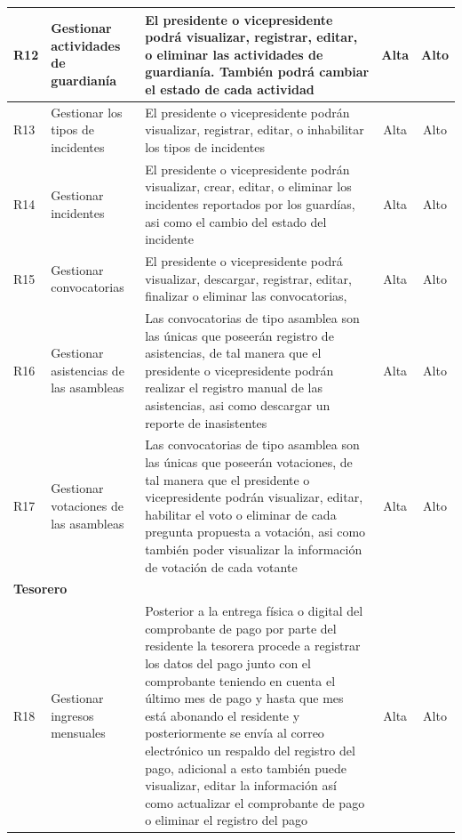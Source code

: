 \begin{spacing}{1}
\begin{center}
\begin{longtable}[l]{|p{}|p{}|p{}|p{}| p{}|}
            \hline
            R12 & Gestionar actividades de guardianía & El presidente o vicepresidente podrá visualizar, registrar, editar, o eliminar las actividades de guardianía.
            También podrá cambiar el estado de cada actividad & \multicolumn{1}{c|}{Alta} & \multicolumn{1}{c|}{Alto}\\
            \hline
            R13         & Gestionar los tipos de incidentes                 & El presidente o vicepresidente podrán visualizar, registrar, editar, o inhabilitar los tipos de incidentes & \multicolumn{1}{c|}{Alta} & \multicolumn{1}{c|}{Alto}\\
            \hline
            R14         & Gestionar incidentes                              & El presidente o vicepresidente podrán visualizar, crear, editar, o eliminar los incidentes reportados por los guardías, asi como el cambio del estado del incidente & \multicolumn{1}{c|}{Alta} & \multicolumn{1}{c|}{Alto}\\
            \hline
            R15         & Gestionar convocatorias                           & El presidente o vicepresidente podrá visualizar, descargar, registrar, editar, finalizar o eliminar las convocatorias,  & \multicolumn{1}{c|}{Alta} & \multicolumn{1}{c|}{Alto}\\
            \hline
            R16         & Gestionar asistencias de las asambleas            & Las convocatorias de tipo asamblea son las únicas que poseerán registro de asistencias, de tal manera que el presidente o vicepresidente podrán realizar el registro manual de las asistencias, asi como descargar un reporte de inasistentes & \multicolumn{1}{c|}{Alta} & \multicolumn{1}{c|}{Alto}\\
            \hline
            R17         & Gestionar votaciones de las asambleas             & Las convocatorias de tipo asamblea son las únicas que poseerán votaciones, de tal manera que el presidente o vicepresidente podrán visualizar, editar, habilitar el voto o eliminar de cada pregunta propuesta a votación, asi como también poder visualizar la información de votación de cada votante & \multicolumn{1}{c|}{Alta} & \multicolumn{1}{c|}{Alto}\\
            \hline
            \multicolumn{5}{|l|}{ \textbf{Tesorero} } \\
            \hline
            R18         & Gestionar ingresos mensuales                      & Posterior a la entrega física o digital del comprobante de pago por parte del residente la tesorera procede a registrar los datos del pago junto con el comprobante teniendo en cuenta el último mes de pago y hasta que mes está abonando el residente y posteriormente se envía al correo electrónico un respaldo del registro del pago, adicional a esto también puede visualizar, editar la información así como actualizar el comprobante de pago o eliminar el registro del pago & \multicolumn{1}{c|}{Alta} & \multicolumn{1}{c|}{Alto}\\

\end{longtable}
\end{center}
\end{spacing}
